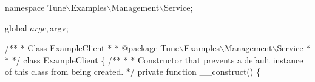 \begin{DoxyCodeInclude}
\textcolor{keyword}{namespace }Tune\(\backslash\)Examples\(\backslash\)Management\(\backslash\)Service;

global $argc, $argv;

\textcolor{comment}{}
\textcolor{comment}{/**}
\textcolor{comment}{ * Class ExampleClient}
\textcolor{comment}{ *}
\textcolor{comment}{ * @package Tune\(\backslash\)Examples\(\backslash\)Management\(\backslash\)Service}
\textcolor{comment}{ *}
\textcolor{comment}{ *}
\textcolor{comment}{ */}
\textcolor{keyword}{class }ExampleClient
\{\textcolor{comment}{}
\textcolor{comment}{    /**}
\textcolor{comment}{     *}
\textcolor{comment}{     * Constructor that prevents a default instance of this class from being created.}
\textcolor{comment}{     */}
    \textcolor{keyword}{private} \textcolor{keyword}{function} \_\_construct()
    \{


\end{DoxyCodeInclude}
